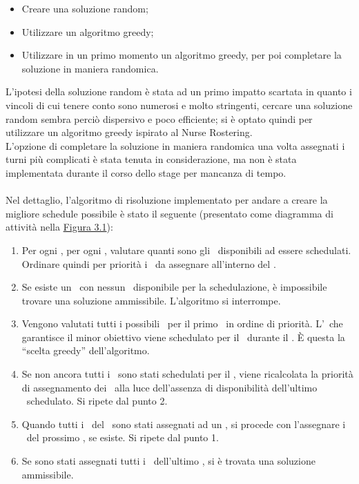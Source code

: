 \begin{itemize}
\item Creare una soluzione random;
\item Utilizzare un algoritmo greedy;
\item Utilizzare in un primo momento un algoritmo greedy, per poi completare la soluzione in maniera randomica.
\end{itemize}
\noindent
L’ipotesi della soluzione random è stata ad un primo impatto scartata in quanto i vincoli di cui tenere conto sono numerosi e molto stringenti, cercare una soluzione random sembra perciò dispersivo e poco efficiente; si è optato quindi per utilizzare un algoritmo greedy ispirato al Nurse Rostering. \\
L’opzione di completare la soluzione in maniera randomica una volta assegnati i turni più complicati è stata tenuta in considerazione, ma non è stata implementata durante il corso dello stage per mancanza di tempo.
\\ \\
Nel dettaglio, l'algoritmo di risoluzione implementato per andare a creare la migliore schedule possibile è stato il seguente (presentato come diagramma di attività nella \hyperref[fig31]{Figura 3.1}):
\begin{enumerate}
\item Per ogni \ttb, per ogni \task, valutare quanti sono gli \items\ disponibili ad essere schedulati. Ordinare quindi per priorità i \task\ da assegnare all'interno del \ttb.
\item Se esiste un \task\ con nessun \items\ disponibile per la schedulazione, è impossibile trovare una soluzione ammissibile. L'algoritmo si interrompe.
\item Vengono valutati tutti i possibili \items\ per il primo \task\ in ordine di priorità. L'\items\ che garantisce il minor obiettivo viene schedulato per il \task\ durante il \ttb. È questa la ``scelta greedy'' dell'algoritmo.
\item Se non ancora tutti i \task\ sono stati schedulati per il \ttb, viene ricalcolata la priorità di assegnamento dei \task\ alla luce dell'assenza di disponibilità dell'ultimo \items\ schedulato. Si ripete dal punto 2.
\item Quando tutti i \task\ del \ttb\ sono stati assegnati ad un \items, si procede con l'assegnare i \task\ del prossimo \ttb, se esiste. Si ripete dal punto 1.
\item Se sono stati assegnati tutti i \task\ dell'ultimo \ttb, si è trovata una soluzione ammissibile.
\end{enumerate}

